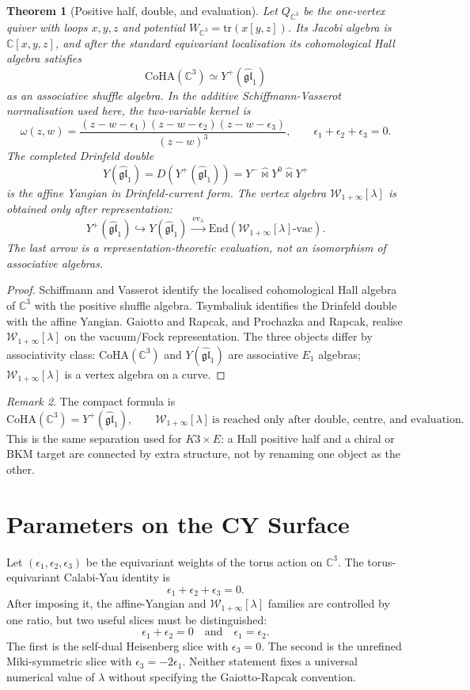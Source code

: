 \documentclass[11pt]{article}
\newtheorem{theorem}{Theorem}[section]
\theoremstyle{definition}
\theoremstyle{remark}
\newtheorem{remark}[theorem]{Remark}
\providecommand{\CoHA}{\mathrm{CoHA}}
\providecommand{\Winf}{\mathcal{W}_{1+\infty}}
\providecommand{\End}{\mathrm{End}}
\providecommand{\CC}{\mathbb{C}}
\providecommand{\gghone}{\widehat{\mathfrak{gl}}_1}
\providecommand{\Eone}{E_1}
\begin{document}
\begin{theorem}[Positive half, double, and evaluation]
\label{thm:c3-dictionary}
Let $Q_{\CC^3}$ be the one-vertex quiver with loops $x,y,z$ and
potential $W_{\CC^3}=\mathrm{tr}(x[y,z])$. Its Jacobi algebra is $\CC[x,y,z]$,
and after the standard equivariant localisation its cohomological Hall
algebra satisfies
\[
 \CoHA(\CC^3)\simeq Y^+(\gghone)
\]
as an associative shuffle algebra. In the additive Schiffmann-Vasserot
normalisation used here, the two-variable kernel is
\[
 \omega(z,w)=
 \frac{(z-w-\epsilon_1)(z-w-\epsilon_2)(z-w-\epsilon_3)}
 {(z-w)^3},
 \qquad \epsilon_1+\epsilon_2+\epsilon_3=0.
\]
The completed Drinfeld double
\[
 Y(\gghone)=D(Y^+(\gghone))=
 Y^-\widehat{\bowtie}Y^0\widehat{\bowtie}Y^+
\]
is the affine Yangian in Drinfeld-current form. The vertex algebra
$\Winf[\lambda]$ is obtained only after representation:
\[
 Y^+(\gghone)\hookrightarrow Y(\gghone)
 \xrightarrow{\ \mathrm{ev}_\lambda\ }
 \End(\Winf[\lambda]\text{-vac}).
\]
The last arrow is a representation-theoretic evaluation, not an
isomorphism of associative algebras.
\end{theorem}

\begin{proof}
Schiffmann and Vasserot identify the localised cohomological Hall
algebra of $\CC^3$ with the positive shuffle algebra. Tsymbaliuk identifies the
Drinfeld double with the affine Yangian. Gaiotto and Rapcak, and
Prochazka and Rapcak, realise $\Winf[\lambda]$ on the vacuum/Fock
representation. The three objects differ by associativity class:
$\CoHA(\CC^3)$ and $Y(\gghone)$ are associative $\Eone$ algebras;
$\Winf[\lambda]$ is a vertex algebra on a curve.
\end{proof}

\begin{remark}
The compact formula is
\[
 \CoHA(\CC^3)=Y^+(\gghone),
 \qquad
 \Winf[\lambda]\ \text{is reached only after double, centre, and evaluation}.
\]
This is the same separation used for $K3\times E$: a Hall positive half
and a chiral or BKM target are connected by extra structure, not by
renaming one object as the other.
\end{remark}

\section{Parameters on the CY Surface}
\label{sec:parameters}

Let $(\epsilon_1,\epsilon_2,\epsilon_3)$ be the equivariant weights of
the torus action on $\CC^3$. The torus-equivariant Calabi-Yau identity
is
\[
 \epsilon_1+\epsilon_2+\epsilon_3=0.
\]
After imposing it, the affine-Yangian and $\Winf[\lambda]$ families are
controlled by one ratio, but two useful slices must be distinguished:
\[
 \epsilon_1+\epsilon_2=0
 \quad\text{and}\quad
 \epsilon_1=\epsilon_2.
\]
The first is the self-dual Heisenberg slice with $\epsilon_3=0$. The
second is the unrefined Miki-symmetric slice with
$\epsilon_3=-2\epsilon_1$. Neither statement fixes a universal numerical
value of $\lambda$ without specifying the Gaiotto-Rapcak convention.
\end{document}
